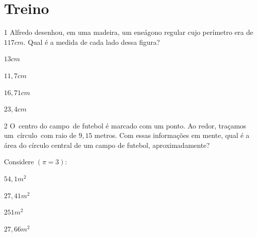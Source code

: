 \pagebreak

\section{Treino}

\num{1} Alfredo desenhou, em uma madeira, um eneágono regular cujo perímetro
era de $117 cm$. Qual é a medida de cada lado dessa figura?


\begin{escolha}
\item $13 cm$ 
\item $11,7 cm$
\item $16,71 cm$
\item $23,4 cm$
\end{escolha}







\num{2} O~centro do campo~de futebol é marcado com um ponto. Ao redor,
traçamos um~círculo~com raio de $9,15$ metros. Com essas informações em
mente, qual é a área do círculo central de um campo de futebol,
aproximadamente?

Considere $(\pi = 3)$:

\begin{escolha}
\item $54,1 m^2$
\item $27,41 m^2$
\item $251 m^2$ 
\item $27,66 m^2$
\end{escolha}


